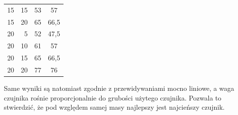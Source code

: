 \begin{table}[!h]
\begin{tabular}{r|r|c|c}
15                                                                                            & 15                                                                                            & 53                                                                                   & 57                                                                                   \\
15                                                                                            & 20                                                                                            & 65                                                                                   & 66,5                                                                                 \\
\hline
20                                                                                            & 5                                                                                             & 52                                                                                   & 47,5                                                                                 \\
20                                                                                            & 10                                                                                            & 61                                                                                   & 57                                                                                   \\
20                                                                                            & 15                                                                                            & 65                                                                                   & 66,5                                                                                 \\
20                                                                                            & 20                                                                                            & 77                                                                                   & 76                                                                                  
\end{tabular}
\label{t_badanie_2_wyniki}
\end{table}

Same wyniki są natomiast zgodnie z przewidywaniami mocno liniowe, a waga czujnika rośnie proporcjonalnie do grubości użytego czujnika. Pozwala to stwierdzić, że pod względem samej masy najlepszy jest najcieńszy czujnik.

